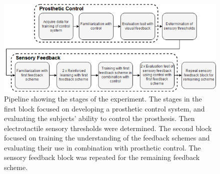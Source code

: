\begin{figure}[h]
	
	\includegraphics[width=.85\textwidth]{figures/std_paper}
	\caption{Pipeline showing the stages of the experiment. The stages in the first block focused on developing a prosthetic control system, and evaluating the subjects' ability to control the prosthesis. Then electrotactile sensory thresholds were determined. The second block focused on training the understanding of the feedback schemes and evaluating their use in combination with prosthetic control. The sensory feedback block was repeated for the remaining feedback scheme.}
	\label{fig:pa:std_pap} 
\end{figure}

